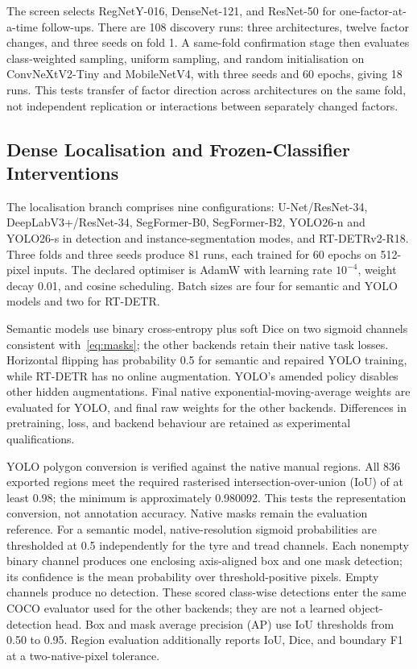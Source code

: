 The screen selects RegNetY-016, DenseNet-121, and ResNet-50 for one-factor-at-a-time follow-ups. There are 108 discovery runs: three architectures, twelve factor changes, and three seeds on fold 1. A same-fold confirmation stage then evaluates class-weighted sampling, uniform sampling, and random initialisation on ConvNeXtV2-Tiny and MobileNetV4, with three seeds and 60 epochs, giving 18 runs. This tests transfer of factor direction across architectures on the same fold, not independent replication or interactions between separately changed factors.

\subsection{Dense Localisation and Frozen-Classifier Interventions}
The localisation branch comprises nine configurations: U-Net/ResNet-34, DeepLabV3+/ResNet-34, SegFormer-B0, SegFormer-B2, YOLO26-n and YOLO26-s in detection and instance-segmentation modes, and RT-DETRv2-R18. Three folds and three seeds produce 81 runs, each trained for 60 epochs on 512-pixel inputs. The declared optimiser is AdamW with learning rate $10^{-4}$, weight decay 0.01, and cosine scheduling. Batch sizes are four for semantic and YOLO models and two for RT-DETR.

Semantic models use binary cross-entropy plus soft Dice on two sigmoid channels consistent with~\eqref{eq:masks}; the other backends retain their native task losses. Horizontal flipping has probability 0.5 for semantic and repaired YOLO training, while RT-DETR has no online augmentation. YOLO's amended policy disables other hidden augmentations. Final native exponential-moving-average weights are evaluated for YOLO, and final raw weights for the other backends. Differences in pretraining, loss, and backend behaviour are retained as experimental qualifications.

YOLO polygon conversion is verified against the native manual regions. All 836 exported regions meet the required rasterised intersection-over-union (IoU) of at least 0.98; the minimum is approximately 0.980092. This tests the representation conversion, not annotation accuracy. Native masks remain the evaluation reference. For a semantic model, native-resolution sigmoid probabilities are thresholded at 0.5 independently for the tyre and tread channels. Each nonempty binary channel produces one enclosing axis-aligned box and one mask detection; its confidence is the mean probability over threshold-positive pixels. Empty channels produce no detection. These scored class-wise detections enter the same COCO evaluator used for the other backends; they are not a learned object-detection head. Box and mask average precision (AP) use IoU thresholds from 0.50 to 0.95. Region evaluation additionally reports IoU, Dice, and boundary F1 at a two-native-pixel tolerance.

